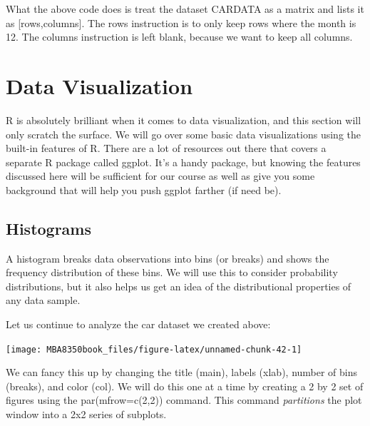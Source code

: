 \documentclass[
]{book}
\newenvironment{Shaded}{\begin{snugshade}}{\end{snugshade}}
\newcommand{\FunctionTok}[1]{\textcolor[rgb]{0.00,0.00,0.00}{#1}}
\newcommand{\NormalTok}[1]{#1}
\newcommand{\SpecialCharTok}[1]{\textcolor[rgb]{0.00,0.00,0.00}{#1}}
\begin{document}
What the above code does is treat the dataset CARDATA as a matrix and lists it as {[}rows,columns{]}. The rows instruction is to only keep rows where the month is 12. The columns instruction is left blank, because we want to keep all columns.

\hypertarget{data-visualization}{%
\section{Data Visualization}\label{data-visualization}}

R is absolutely brilliant when it comes to data visualization, and this section will only scratch the surface. We will go over some basic data visualizations using the built-in features of R. There are a lot of resources out there that covers a separate R package called ggplot. It's a handy package, but knowing the features discussed here will be sufficient for our course as well as give you some background that will help you push ggplot farther (if need be).

\hypertarget{histograms}{%
\subsection{Histograms}\label{histograms}}

A histogram breaks data observations into bins (or breaks) and shows the frequency distribution of these bins. We will use this to consider probability distributions, but it also helps us get an idea of the distributional properties of any data sample.

Let us continue to analyze the car dataset we created above:

\begin{Shaded}
\end{Shaded}

\begin{center}\texttt{[image: MBA8350book\_files/figure-latex/unnamed-chunk-42-1]} \end{center}

We can fancy this up by changing the title (main), labels (xlab), number of bins (breaks), and color (col). We will do this one at a time by creating a 2 by 2 set of figures using the par(mfrow=c(2,2)) command. This command \emph{partitions} the plot window into a 2x2 series of subplots.
\end{document}
